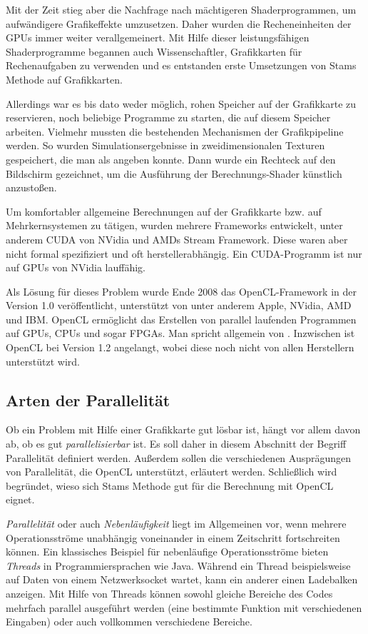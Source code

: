 Mit der Zeit stieg aber die Nachfrage nach mächtigeren Shaderprogrammen, um
aufwändigere Grafikeffekte umzusetzen. Daher wurden die Recheneinheiten der GPUs
immer weiter verallgemeinert. Mit Hilfe dieser leistungsfähigen Shaderprogramme
begannen auch Wissenschaftler, Grafikkarten für Rechenaufgaben zu verwenden und
es entstanden  erste Umsetzungen von Stams Methode auf
Grafikkarten\cite{Wu2004}.

Allerdings war es bis dato weder möglich, rohen Speicher auf der
Grafikkarte zu reservieren, noch beliebige Programme zu starten, die
auf diesem Speicher arbeiten. Vielmehr mussten die bestehenden
Mechanismen der Grafikpipeline  werden. So
wurden Simulationsergebnisse in zweidimensionalen Texturen
gespeichert, die man als  angeben
konnte. Dann wurde ein Rechteck auf den Bildschirm gezeichnet, um die
Ausführung der Berechnungs-Shader künstlich anzustoßen.

Um komfortabler allgemeine Berechnungen auf der Grafikkarte bzw. auf
Mehrkernsystemen zu tätigen, wurden mehrere Frameworks entwickelt,
unter anderem CUDA von NVidia und AMDs Stream Framework. Diese waren
aber nicht formal spezifiziert und oft herstellerabhängig. Ein
CUDA-Programm ist \PimiddyzB nur auf GPUs von NVidia lauffähig.

Als Lösung für dieses Problem wurde Ende 2008 das OpenCL-Framework in
der Version 1.0 veröffentlicht, unterstützt von unter anderem Apple,
NVidia, AMD und IBM. OpenCL ermöglicht das Erstellen von parallel
laufenden Programmen auf GPUs, CPUs und sogar FPGAs. Man spricht
allgemein von . Inzwischen ist
OpenCL bei Version 1.2 angelangt, wobei diese noch nicht von allen
Herstellern unterstützt wird.

\subsection{Arten der Parallelität}

Ob ein Problem mit Hilfe einer Grafikkarte gut lösbar ist, hängt vor allem davon
ab, ob es gut \emph{parallelisierbar} ist. Es soll daher in diesem Abschnitt der
Begriff Parallelität definiert werden. Außerdem sollen die verschiedenen
Ausprägungen von Parallelität, die OpenCL unterstützt, erläutert werden.
Schließlich wird begründet, wieso sich Stams Methode gut für die Berechnung mit
OpenCL eignet.

\emph{Parallelität} oder auch \emph{Nebenläufigkeit} liegt im
Allgemeinen vor, wenn mehrere Operationsströme unabhängig voneinander
in einem Zeitschritt fortschreiten können\cite{munshi2011}. Ein
klassisches Beispiel für nebenläufige Operationsströme bieten
\emph{Threads} in Programmiersprachen wie Java. Während ein Thread
beispielsweise auf Daten von einem Netzwerksocket wartet, kann ein
anderer einen Ladebalken anzeigen. Mit Hilfe von Threads können sowohl
gleiche Bereiche des Codes mehrfach parallel ausgeführt werden
(\PimiddyzB eine bestimmte Funktion mit verschiedenen Eingaben) oder
auch vollkommen verschiedene Bereiche.

